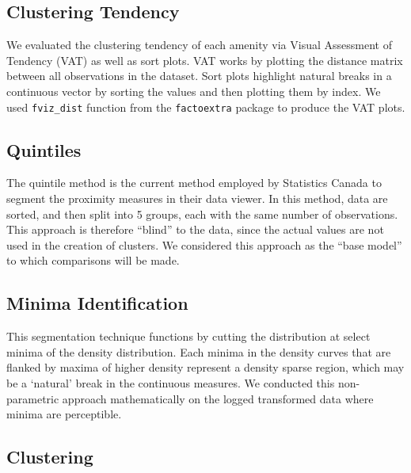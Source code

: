 \documentclass[11pt, a4paper]{article}
\begin{document}
\subsection{Clustering Tendency}


We evaluated the clustering tendency of each amenity via Visual Assessment of Tendency (VAT) as well as sort plots. VAT works by plotting the distance matrix between all observations in the dataset. Sort plots highlight natural breaks in a continuous vector by sorting the values and then plotting them by index. We used \texttt{fviz\_dist} function from the \texttt{factoextra} package to produce the VAT plots.





\subsection{Quintiles}


The quintile method is the current method employed by Statistics Canada to segment the proximity measures in their data viewer. In this method, data are sorted, and then split into 5 groups, each with the same number of observations. This approach is therefore ``blind'' to the data, since the actual values are not used in the creation of clusters. We considered this approach as the “base model” to which comparisons will be made.







\subsection{Minima Identification}


This segmentation technique functions by cutting the distribution at select minima of the density distribution. Each minima in the density curves that are flanked by maxima of higher density represent a density sparse region, which may be a `natural' break in the continuous measures. We conducted this non-parametric approach mathematically on the logged transformed data where minima are perceptible.







\subsection{Clustering}
\end{document}
